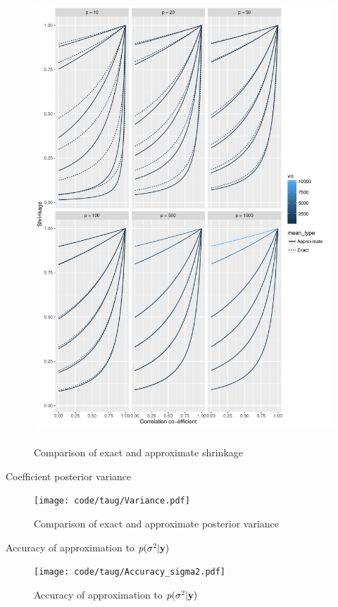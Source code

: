 \documentclass{amsart}[12pt]
\begin{document}
\begin{figure}[p]
	\caption{Comparison of exact and approximate shrinkage}
	\label{fig:shrinkage}
	\includegraphics[width=17cm, height=17cm]{Chapter_3_shrinkage.pdf}
\end{figure}

Coefficient posterior variance \\

\begin{figure}[p]
	\caption{Comparison of exact and approximate posterior variance}
	\label{fig:variance}
	\texttt{[image: code/taug/Variance.pdf]}
\end{figure}

Accuracy of approximation to $p(\sigma^2 | {\bf y})$ \\

\begin{figure}[p]
	\caption{Accuracy of approximation to $p(\sigma^2 | {\bf y})$}
	\label{fig:accuracy_sigma2}
	\texttt{[image: code/taug/Accuracy\_sigma2.pdf]}
\end{figure}
\end{document}
